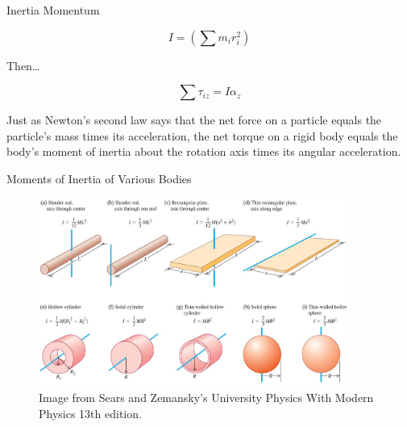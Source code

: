\documentclass[]{beamer}
\begin{document}




\begin{frame}

  Inertia Momentum
  \vspace{7mm}

 \begin{equation}
   I=\left( \sum m_i r^2_i    \right)
 \end{equation}     

 \vspace{7mm}

 \pause

 Then\dots
 \vspace{7mm}

 \begin{equation}
  \sum \tau_{iz}=I \alpha_z
 \end{equation}

 \pause
Just as Newton’s second law says that the net force on a particle equals the particle’s
mass times its acceleration, the net torque on a rigid body equals
the body’s moment of inertia about the rotation axis times its angular acceleration.

\end{frame}




\begin{frame}
  Moments of Inertia of Various Bodies
  \vspace{7mm}


\begin{figure}[h!]  
  \includegraphics[width=0.9\textwidth]{images/7.jpg}
  \caption{Image from Sears and Zemansky's University Physics With 
  Modern Physics 13th edition. }
\end{figure}


\end{frame}
\end{document}
